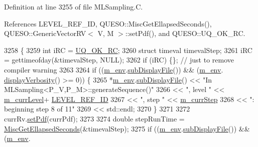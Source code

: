Definition at line 3255 of file M\-L\-Sampling.\-C.



References L\-E\-V\-E\-L\-\_\-\-R\-E\-F\-\_\-\-I\-D, Q\-U\-E\-S\-O\-::\-Misc\-Get\-Ellapsed\-Seconds(), Q\-U\-E\-S\-O\-::\-Generic\-Vector\-R\-V$<$ V, M $>$\-::set\-Pdf(), and Q\-U\-E\-S\-O\-::\-U\-Q\-\_\-\-O\-K\-\_\-\-R\-C.


\begin{DoxyCode}
3258 \{
3259   \textcolor{keywordtype}{int} iRC = \hyperlink{namespace_q_u_e_s_o_a8e909502900aecf24cedba022ea84471}{UQ\_OK\_RC};
3260   \textcolor{keyword}{struct }timeval timevalStep;
3261   iRC = gettimeofday(&timevalStep, NULL);
3262   \textcolor{keywordflow}{if} (iRC) \{\}; \textcolor{comment}{// just to remove compiler warning}
3263 
3264       \textcolor{keywordflow}{if} ((\hyperlink{class_q_u_e_s_o_1_1_m_l_sampling_a13f1ca4fe9f94822fe572a743eaced1d}{m\_env}.\hyperlink{class_q_u_e_s_o_1_1_base_environment_a8a0064746ae8dddfece4229b9ad374d6}{subDisplayFile}()) && (\hyperlink{class_q_u_e_s_o_1_1_m_l_sampling_a13f1ca4fe9f94822fe572a743eaced1d}{m\_env}.
      \hyperlink{class_q_u_e_s_o_1_1_base_environment_a1fe5f244fc0316a0ab3e37463f108b96}{displayVerbosity}() >= 0)) \{
3265         *\hyperlink{class_q_u_e_s_o_1_1_m_l_sampling_a13f1ca4fe9f94822fe572a743eaced1d}{m\_env}.\hyperlink{class_q_u_e_s_o_1_1_base_environment_a8a0064746ae8dddfece4229b9ad374d6}{subDisplayFile}() << \textcolor{stringliteral}{"In MLSampling<P\_V,P\_M>::generateSequence()"}
3266                                 << \textcolor{stringliteral}{", level "} << \hyperlink{class_q_u_e_s_o_1_1_m_l_sampling_af9416874c856e50f3b35270e801f17e4}{m\_currLevel}+
      \hyperlink{_m_l_sampling_level_options_8h_a68d15eaf394d210effcf584b938206d3}{LEVEL\_REF\_ID}
3267                                 << \textcolor{stringliteral}{", step "}  << \hyperlink{class_q_u_e_s_o_1_1_m_l_sampling_a1b1f8ccb4823bdfa26ec652f0807c63e}{m\_currStep}
3268                                 << \textcolor{stringliteral}{": beginning step 8 of 11"}
3269                                 << std::endl;
3270       \}
3271 
3272       currRv.\hyperlink{class_q_u_e_s_o_1_1_generic_vector_r_v_a1645a2db9e84b44df65faefda9921277}{setPdf}(currPdf);
3273 
3274   \textcolor{keywordtype}{double} stepRunTime = \hyperlink{namespace_q_u_e_s_o_a424bc33f2e6e287fd468408d14b772ee}{MiscGetEllapsedSeconds}(&timevalStep);
3275   \textcolor{keywordflow}{if} ((\hyperlink{class_q_u_e_s_o_1_1_m_l_sampling_a13f1ca4fe9f94822fe572a743eaced1d}{m\_env}.\hyperlink{class_q_u_e_s_o_1_1_base_environment_a8a0064746ae8dddfece4229b9ad374d6}{subDisplayFile}()) && (\hyperlink{class_q_u_e_s_o_1_1_m_l_sampling_a13f1ca4fe9f94822fe572a743eaced1d}{m\_env}.

\end{DoxyCode}
